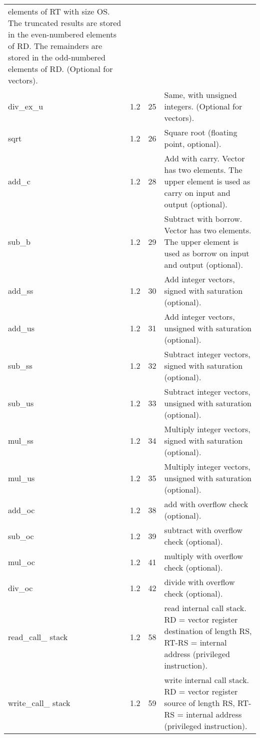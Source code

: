 \documentclass[forwardcom.tex]{subfiles}
\begin{document}
\begin{longtable} {|p{20mm}|p{10mm}|p{8mm}|p{75mm}|}
elements of RT with size OS. The truncated results are stored in
the even-numbered elements of RD. The remainders are stored in
the odd-numbered elements of RD. (Optional for vectors). \\
div\_ex\_u    & 1.2 & 25 & Same, with unsigned integers. (Optional for vectors). \\
sqrt          & 1.2 & 26 & Square root (floating point, optional). \\
add\_c        & 1.2 & 28 & Add with carry. Vector has two elements. The upper element is used as carry on input and output (optional). \\
sub\_b        & 1.2 & 29 & Subtract with borrow. Vector has two elements. The upper element is used as borrow on input and output (optional). \\
add\_ss       & 1.2 & 30 & Add integer vectors, signed with saturation (optional). \\
add\_us       & 1.2 & 31 & Add integer vectors, unsigned with saturation (optional). \\
sub\_ss       & 1.2 & 32 & Subtract integer vectors, signed with saturation (optional). \\
sub\_us       & 1.2 & 33 & Subtract integer vectors, unsigned with saturation (optional). \\
mul\_ss       & 1.2 & 34 & Multiply integer vectors, signed with saturation (optional). \\
mul\_us       & 1.2 & 35 & Multiply integer vectors, unsigned with saturation (optional). \\
add\_oc       & 1.2 & 38 & add with overflow check (optional). \\
sub\_oc       & 1.2 & 39 & subtract with overflow check (optional). \\
mul\_oc       & 1.2 & 41 & multiply with overflow check (optional). \\
div\_oc       & 1.2 & 42 & divide with overflow check (optional). \\

read\_call\_ stack & 1.2 & 58 & read internal call stack. RD = vector register destination of length RS, RT-RS = internal address (privileged instruction). \\
write\_call\_ stack & 1.2 & 59 & write internal call stack. RD = vector register source of length RS, RT-RS = internal address (privileged instruction). \\


\end{longtable}
\end{document}
